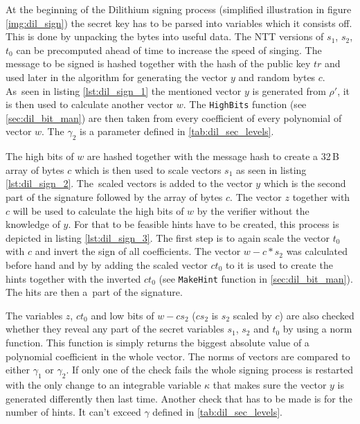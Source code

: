 At the beginning of the Dilithium signing process (simplified illustration in figure \ref{img:dil_sign}) the secret key has to be parsed into variables which it consists off. This is done by unpacking the bytes into useful data. The NTT versions of $s_1$, $s_2$, $t_0$ can be precomputed ahead of time to increase the speed of singing. 
\noindent The message to be signed is hashed together with the hash of the public key $tr$ and used later in the algorithm for generating the vector $y$ and random bytes $c$. As~seen in listing \ref{lst:dil_sign_1} the mentioned vector $y$ is generated from $\rho'$, it is then used to calculate another vector $w$. The \texttt{HighBits} function (see \ref{sec:dil_bit_man}) are then taken from every coefficient of every polynomial of vector $w$. The $\gamma_2$ is a parameter defined in \ref{tab:dil_sec_levels}.

The high bits of $w$ are hashed together with the message hash to create a 32\,B array of bytes $c$ which is then used to scale vectors $s_1$ as seen in listing \ref{lst:dil_sign_2}. The~scaled vectors is added to the vector $y$ which is the second part of the signature followed by the array of bytes $c$. 
The vector $z$ together with $c$ will be used to calculate the high bits of $w$ by the verifier without the knowledge of $y$. For that to be feasible hints have to be created, this process is depicted in listing \ref{lst:dil_sign_3}. The first step is to again scale the vector $t_0$ with $c$ and invert the sign of all coefficients. The vector $w-c*s_2$ was calculated before hand and by by adding the scaled vector $ct_0$ to it is used to create the hints together with the inverted $ct_0$ (see \texttt{MakeHint} function in \ref{sec:dil_bit_man}). The hits are then a~part of the signature.
\newpage 
{}

The variables $z$, $ct_0$ and low bits of $w-cs_2$ ($cs_2$ is $s_2$ scaled by $c$) are also checked whether they reveal any part of the secret variables $s_1$, $s_2$ and $t_0$ by using a norm function. This function is simply returns the biggest absolute value of a polynomial coefficient in the whole vector. The norms of vectors are compared to either $\gamma_1$ or $\gamma_2$. If only one of the check fails the whole signing process is restarted with the only change to an integrable variable $\kappa$ that makes sure the vector $y$ is generated differently then last time. Another check that has to be made is for the number of hints. It can't exceed $\gamma$ defined in \ref{tab:dil_sec_levels}.

